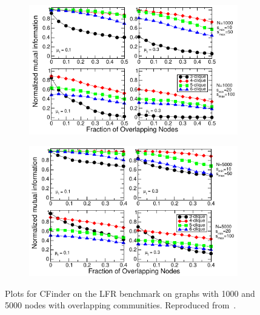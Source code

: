 \begin{figure}[h!]
    \centering
    \begin{subfigure}{0.4\textwidth}
    \centering
    \includegraphics[width=\cfinderwidth]{lfrpaper/fig6.pdf}
    \end{subfigure}%
    \begin{subfigure}{0.4\textwidth}
    \centering
    \includegraphics[width=\cfinderwidth]{lfrpaper/fig7.pdf}
    \end{subfigure}%
    \caption{
        Plots for CFinder on the LFR benchmark on graphs with 1000 and 5000 nodes 
		with overlapping communities. Reproduced from~\cite{LF09}.
    }\label{fig:CFinder_overlapping}
\end{figure}


